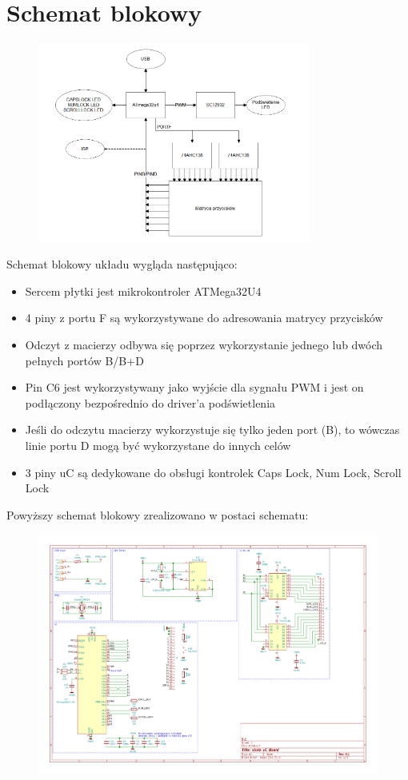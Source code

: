 \documentclass{article}
\begin{document}
    \section{Schemat blokowy}
    \begin{figure}[h]
        \centering
        \includegraphics[width=0.8\textwidth]{3}
    \end{figure}
    \newpage
    Schemat blokowy układu wygląda następująco:
    \begin{itemize}
        \item Sercem płytki jest mikrokontroler ATMega32U4
        \item 4 piny z portu F są wykorzystywane do adresowania matrycy przycisków
        \item Odczyt z macierzy odbywa się poprzez wykorzystanie jednego lub dwóch pełnych portów B/B+D
        \item Pin C6 jest wykorzystywany jako wyjście dla sygnału PWM i jest on podłączony bezpośrednio do driver'a podświetlenia
        \item Jeśli do odczytu macierzy wykorzystuje się tylko jeden port (B), to wówczas linie portu D mogą być wykorzystane do innych celów
        \item 3 piny uC są dedykowane do obsługi kontrolek Caps Lock, Num Lock, Scroll Lock
    \end{itemize}
    Powyższy schemat blokowy zrealizowano w postaci schematu:
    \begin{figure}[h]
        \centering
        \includegraphics[width=\textwidth]{slckb.pdf}
    \end{figure}
\end{document}
